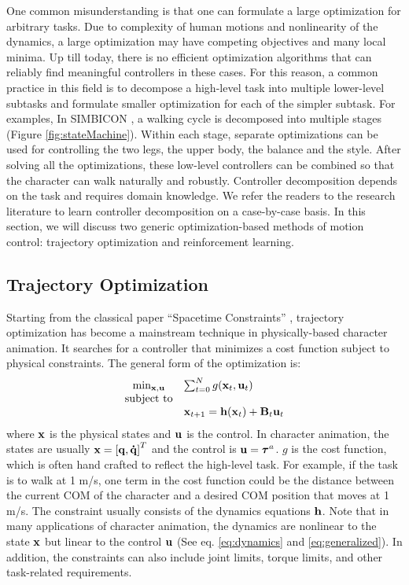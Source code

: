 One common misunderstanding is that one can formulate a large optimization for arbitrary tasks. Due to complexity of human motions and nonlinearity of the dynamics, a large optimization may have competing objectives and many local minima. Up till today, there is no efficient optimization algorithms that can reliably find meaningful controllers in these cases. For this reason, a common practice in this field is to decompose a high-level task into multiple lower-level subtasks and formulate smaller optimization for each of the simpler subtask. For examples, In SIMBICON \cite{Yin:2007:SIM}, a walking cycle is decomposed into multiple stages (Figure \ref{fig:stateMachine}). Within each stage, separate optimizations can be used for controlling the two legs, the upper body, the balance and the style. After solving all the optimizations, these low-level controllers can be combined so that the character can walk naturally and robustly. Controller decomposition depends on the task and requires domain knowledge. We refer the readers to the research literature to learn controller decomposition on a case-by-case basis. In this section, we will discuss two generic optimization-based methods of motion control: trajectory optimization and reinforcement learning. 



\subsection{Trajectory Optimization}
Starting from the classical paper ``Spacetime Constraints'' \cite{Witkin:1988}, trajectory optimization has become a mainstream technique in physically-based character animation. It searches for a controller that minimizes a cost function subject to physical constraints. The general form of the optimization is:
\begin{equation}
  \begin{array}{cl}
    \min_{\vc{x},\vc{u}}&\sum_{t=0}^{N}g(\vc{x}_t,\vc{u}_t)\\
    \textrm{subject to}&\\
    &\vc{x}_{t+1}=\vc{h}(\vc{x}_t)+\vc{B}_t\vc{u}_t
  \end{array}
  \label{eq:trajectoryOptimization}
\end{equation}
where $\mathbf{x}$ is the physical states and $\mathbf{u}$ is the control. In character animation, the states are usually $\mathbf{x}=\mathbf{[q, \dot{q}]}^T$ and the control is $\mathbf{u}=\boldsymbol{\tau}^a$. $g$ is the cost function, which is often hand crafted to reflect the high-level task. For example, if the task is to walk at 1 m/s, one term in the cost function could be the distance between the current COM of the character and a desired COM position that moves at 1 m/s. The constraint usually consists of the dynamics equations $\mathbf{h}$. Note that in many applications of character animation, the dynamics are nonlinear to the state $\mathbf{x}$ but linear to the control $\mathbf{u}$ (See eq. \ref{eq:dynamics} and \ref{eq:generalized}). In addition, the constraints can also include joint limits, torque limits, and other task-related requirements.

